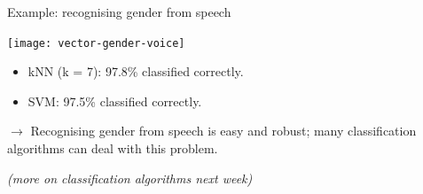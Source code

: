 \documentclass[compress]{beamer}
\begin{document}
\begin{frame}{Example: recognising gender from speech}

    \begin{center}
        \texttt{[image: vector-gender-voice]}
    \end{center}

\pause

\begin{itemize}
\item kNN (k = 7): 97.8\% classified correctly.
\item SVM: 97.5\% classified correctly.
\end{itemize}

$\rightarrow$ Recognising gender from speech is easy and robust; many
    classification algorithms can deal with this problem.

\emph{\scriptsize(more on classification algorithms next week)}
\end{frame}
\end{document}
